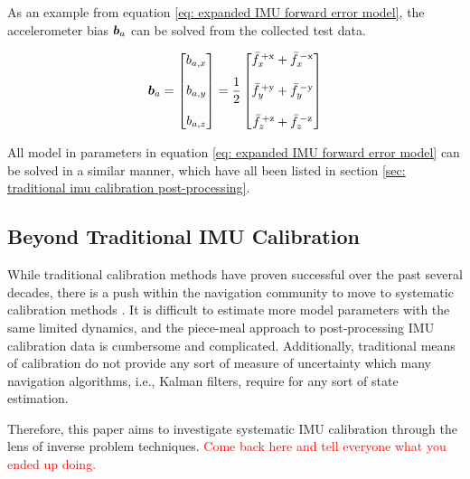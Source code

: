 As an example from equation \ref{eq: expanded IMU forward error model}, the accelerometer bias $\boldsymbol{b}_a$ can be solved from the collected test data.

\begin{align} 
	\boldsymbol{b}_a = \begin{bmatrix} b_{a,x} \\ \\ b_{a,y} \\ \\ b_{a,z} \end{bmatrix} = \frac{1}{2} \begin{bmatrix}
		\bar{f}^{\,+\textrm{x}}_{x} + \bar{f}^{\,-\textrm{x}}_{x} \\
		\\
		\bar{f}^{\,+\textrm{y}}_{y} + \bar{f}^{\,-\textrm{y}}_{y} \\
		\\
		\bar{f}^{\,+\textrm{z}}_{z} + \bar{f}^{\,-\textrm{z}}_{z}
	\end{bmatrix}
\end{align}

All model in parameters in equation \ref{eq: expanded IMU forward error model} can be solved in a similar manner, which have all been listed in section \ref{sec: traditional imu calibration post-processing}.


\subsection{Beyond Traditional IMU Calibration}

While traditional calibration methods have proven successful over the past several decades, there is a push within the navigation community to move to systematic calibration methods \cite{s16060940}. It is difficult to estimate more model parameters with the same limited dynamics, and the piece-meal approach to post-processing IMU calibration data is cumbersome and complicated. Additionally, traditional means of calibration do not provide any sort of measure of uncertainty which many navigation algorithms, i.e., Kalman filters, require for any sort of state estimation.

Therefore, this paper aims to investigate systematic IMU calibration through the lens of inverse problem techniques. \textcolor{red}{Come back here and tell everyone what you ended up doing.}

